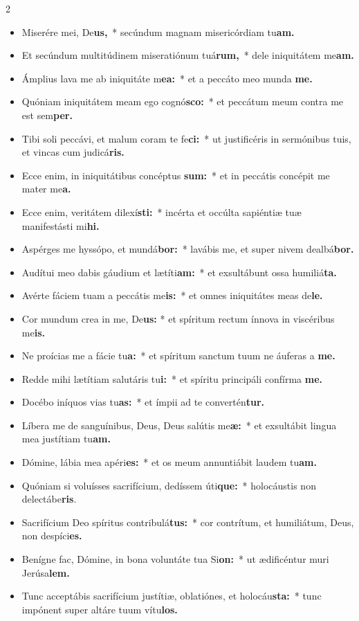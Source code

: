 \begin{multicols}{2}
\begin{itemize}[%
label=\null, %
leftmargin=0pt, %
itemindent=3mm, %
labelsep=0pt, %
labelwidth=0pt, %
rightmargin=0pt, %
parsep=0pt, %
topsep=0pt, %
itemsep=0pt]%


\item Miserére mei, De\textbf{us,}~* secúndum magnam misericórdiam tu\textbf{am.}
\item Et secúndum multitúdinem miseratiónum tuá\textbf{rum,}~* dele iniquitátem me\textbf{am.}
\item Ámplius lava me ab iniquitáte m\textbf{ea:}~* et a peccáto meo munda \textbf{me.}
\item Quóniam iniquitátem meam ego cognó\textbf{sco:}~* et peccátum meum contra me est sem\textbf{per.}
\item Tibi soli peccávi, et malum coram te fe\textbf{ci:}~* ut justificéris in sermónibus tuis, et vincas cum judicá\textbf{ris.}
\item Ecce enim, in iniquitátibus concéptus \textbf{sum:}~* et in peccátis concépit me mater me\textbf{a.}
\item Ecce enim, veritátem dilexí\textbf{sti:}~* incérta et occúlta sapiéntiæ tuæ manifestásti mi\textbf{hi.}
\item Aspérges me hyssópo, et mundá\textbf{bor:}~* lavábis me, et super nivem dealbá\textbf{bor.}
\item Audítui meo dabis gáudium et lætíti\textbf{am:}~* et exsultábunt ossa humiliá\textbf{ta.}
\item Avérte fáciem tuam a peccátis me\textbf{is:}~* et omnes iniquitátes meas de\textbf{le.}
\item Cor mundum crea in me, De\textbf{us: }* et spíritum rectum ínnova in viscéribus me\textbf{is.}
\item Ne proícias me a fácie tu\textbf{a:}~* et spíritum sanctum tuum ne áuferas a \textbf{me.}
\item Redde mihi lætítiam salutáris tu\textbf{i:}~* et spíritu principáli confírma \textbf{me.}
\item Docébo iníquos vias tu\textbf{as:}~* et ímpii ad te convertén\textbf{tur.}
\item Líbera me de sanguínibus, Deus, Deus salútis me\textbf{æ:}~* et exsultábit lingua mea justítiam tu\textbf{am.}
\item Dómine, lábia mea apéri\textbf{es:}~* et os meum annuntiábit laudem tu\textbf{am.}
\item Quóniam si voluísses sacrifícium, dedíssem úti\textbf{que:}~* holocáustis non delectábe\textbf{ris}.
\item Sacrifícium Deo spíritus contribulá\textbf{tus:}~* cor contrítum, et humiliátum, Deus, non despíci\textbf{es.}
\item Benígne fac, Dómine, in bona voluntáte tua Si\textbf{on:}~* ut ædificéntur muri Jerúsa\textbf{lem.}
\item Tunc acceptábis sacrifícium justítiæ, oblatiónes, et holocáu\textbf{sta:}~* tunc impónent super altáre tuum vítu\textbf{los.}

\end{itemize}
\end{multicols}